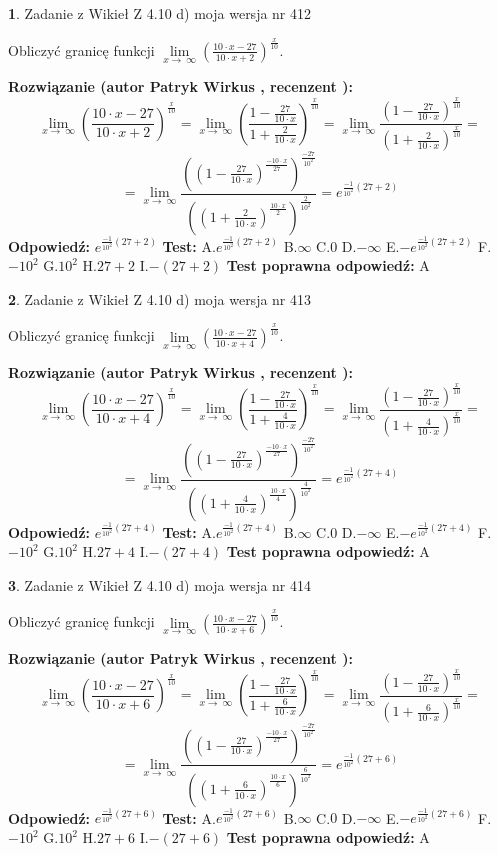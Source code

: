 \documentclass[12pt, a4paper]{article}
\theoremstyle{definition} %
\newtheorem{zad}{}
\newcommand{\zadStart}[1]{\begin{zad}#1\newline}
\newcommand{\zadStop}{\end{zad}}
\newcommand{\rozwStart}[2]{\noindent \textbf{Rozwiązanie (autor #1 , recenzent #2): }\newline}
\newcommand{\rozwStop}{\newline}
\newcommand{\odpStart}{\noindent \textbf{Odpowiedź:}\newline}
\newcommand{\odpStop}{\newline}
\newcommand{\testStart}{\noindent \textbf{Test:}\newline}
\newcommand{\testStop}{\newline}
\newcommand{\kluczStart}{\noindent \textbf{Test poprawna odpowiedź:}\newline}
\newcommand{\kluczStop}{\newline}
\begin{document}
\zadStart{Zadanie z Wikieł Z 4.10 d) moja wersja nr 412}


Obliczyć granicę funkcji  $\lim\limits_{x\to\ \infty}(\frac{10\cdot x-27}{10\cdot x+2})^{\frac{x}{10}}$.
\zadStop
\rozwStart{Patryk Wirkus}{}
$$\lim\limits_{x\to\ \infty}(\frac{10\cdot x-27}{10\cdot x+2})^{\frac{x}{10}} = \lim\limits_{x\to\ \infty}(\frac{1-\frac{27}{10\cdot x}}{1+\frac{2}{10\cdot x}})^{\frac{x}{10}}=\lim\limits_{x\to\ \infty}\frac{(1-\frac{27}{10\cdot x})^{\frac{x}{10}}}{(1+\frac{2}{10\cdot x})^{\frac{x}{10}}}=$$
$$=\lim\limits_{x\to\ \infty}\frac{((1-\frac{27}{10\cdot x})^{\frac{-10\cdot x}{27}})^{\frac{-27}{10^{2}}}}{((1+\frac{2}{10\cdot x})^{\frac{10\cdot x}{2}})^{\frac{2}{10^{2}}}}=e^{\frac{-1}{10^{2}}(27+2)}$$
\rozwStop
\odpStart
$e^{\frac{-1}{10^{2}}(27+2)}$
\odpStop
\testStart
A.$e^{\frac{-1}{10^{2}}(27+2)}$ B.$\infty$ C.$0$ D.$-\infty$ E.$-e^{\frac{-1}{10^{2}}(27+2)}$
F.$-10^{2}$ G.$10^{2}$
H.$27+2$
I.$-(27+2)$
\testStop
\kluczStart
A
\kluczStop



\zadStart{Zadanie z Wikieł Z 4.10 d) moja wersja nr 413}


Obliczyć granicę funkcji  $\lim\limits_{x\to\ \infty}(\frac{10\cdot x-27}{10\cdot x+4})^{\frac{x}{10}}$.
\zadStop
\rozwStart{Patryk Wirkus}{}
$$\lim\limits_{x\to\ \infty}(\frac{10\cdot x-27}{10\cdot x+4})^{\frac{x}{10}} = \lim\limits_{x\to\ \infty}(\frac{1-\frac{27}{10\cdot x}}{1+\frac{4}{10\cdot x}})^{\frac{x}{10}}=\lim\limits_{x\to\ \infty}\frac{(1-\frac{27}{10\cdot x})^{\frac{x}{10}}}{(1+\frac{4}{10\cdot x})^{\frac{x}{10}}}=$$
$$=\lim\limits_{x\to\ \infty}\frac{((1-\frac{27}{10\cdot x})^{\frac{-10\cdot x}{27}})^{\frac{-27}{10^{2}}}}{((1+\frac{4}{10\cdot x})^{\frac{10\cdot x}{4}})^{\frac{4}{10^{2}}}}=e^{\frac{-1}{10^{2}}(27+4)}$$
\rozwStop
\odpStart
$e^{\frac{-1}{10^{2}}(27+4)}$
\odpStop
\testStart
A.$e^{\frac{-1}{10^{2}}(27+4)}$ B.$\infty$ C.$0$ D.$-\infty$ E.$-e^{\frac{-1}{10^{2}}(27+4)}$
F.$-10^{2}$ G.$10^{2}$
H.$27+4$
I.$-(27+4)$
\testStop
\kluczStart
A
\kluczStop



\zadStart{Zadanie z Wikieł Z 4.10 d) moja wersja nr 414}


Obliczyć granicę funkcji  $\lim\limits_{x\to\ \infty}(\frac{10\cdot x-27}{10\cdot x+6})^{\frac{x}{10}}$.
\zadStop
\rozwStart{Patryk Wirkus}{}
$$\lim\limits_{x\to\ \infty}(\frac{10\cdot x-27}{10\cdot x+6})^{\frac{x}{10}} = \lim\limits_{x\to\ \infty}(\frac{1-\frac{27}{10\cdot x}}{1+\frac{6}{10\cdot x}})^{\frac{x}{10}}=\lim\limits_{x\to\ \infty}\frac{(1-\frac{27}{10\cdot x})^{\frac{x}{10}}}{(1+\frac{6}{10\cdot x})^{\frac{x}{10}}}=$$
$$=\lim\limits_{x\to\ \infty}\frac{((1-\frac{27}{10\cdot x})^{\frac{-10\cdot x}{27}})^{\frac{-27}{10^{2}}}}{((1+\frac{6}{10\cdot x})^{\frac{10\cdot x}{6}})^{\frac{6}{10^{2}}}}=e^{\frac{-1}{10^{2}}(27+6)}$$
\rozwStop
\odpStart
$e^{\frac{-1}{10^{2}}(27+6)}$
\odpStop
\testStart
A.$e^{\frac{-1}{10^{2}}(27+6)}$ B.$\infty$ C.$0$ D.$-\infty$ E.$-e^{\frac{-1}{10^{2}}(27+6)}$
F.$-10^{2}$ G.$10^{2}$
H.$27+6$
I.$-(27+6)$
\testStop
\kluczStart
A
\kluczStop
\end{document}
